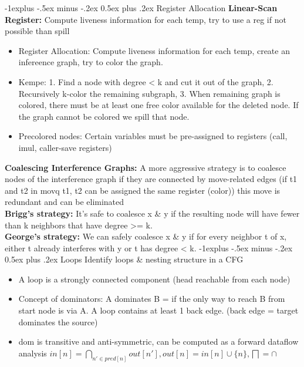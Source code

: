 \documentclass[10pt,landscape]{article}
\makeatletter
\renewcommand{\subsection}{\@startsection{subsection}{2}{0mm}%
                                {-1explus -.5ex minus -.2ex}%
                                {0.5ex plus .2ex}%
                                {\normalfont\normalsize\bfseries}}
\makeatother
\begin{document}
\begin{multicols}{3}
\subsection{Register Allocation}
\textbf{Linear-Scan Register:} Compute liveness information for each temp, try to use a reg if not possible than spill
\begin{itemize}
	\item Register Allocation: Compute liveness information for each temp, create an infereence graph, try to color the graph.
	\item Kempe: 1. Find a node with degree < k and cut it out of the graph, 2. Recursively k-color the remaining subgraph, 3. When remaining graph is colored, there must be at least one free color available for the deleted node. If the graph cannot be colored we spill that node.
	\item Precolored nodes: Certain variables must be pre-assigned to registers (call, imul, caller-save registers)
\end{itemize}
\textbf{Coalescing Interference Graphs:} A more aggressive strategy is to coalesce nodes of the interference
graph if they are connected by move-related edges (if t1 and t2 in movq t1, t2 can be assigned the same register (color)) this move is
redundant and can be eliminated\\
\textbf{Brigg's strategy:} It's safe to coalesce x \& y if the resulting node will have fewer than k neighbors that have degree >= k. \\
\textbf{George's strategy:} We can safely coalesce x \& y if for every neighbor t of x, either t already interferes with y or t has degree < k.
\subsection{Loops}
Identify loops \& nesting structure in a CFG
\begin{itemize}
	\item A loop is a strongly connected component (head reachable from each node)
	\item Concept of dominators: A dominates B = if the only way to reach B from start node is via A. A loop contains at least 1 back edge. (back edge = target dominates the source)
	\item dom is transitive and anti-symmetric, can be computed as a forward dataflow analysis $in[n] = \bigcap_{n' \in pred[n]}out[n'], out[n] = in[n] \cup \{n\}, \bigsqcap = \cap$
\end{itemize}

\end{multicols}
\end{document}

